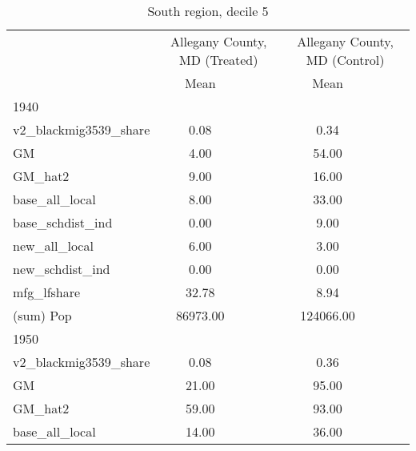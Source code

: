 \begin{table}[htbp]\centering
\def\sym#1{\ifmmode^{#1}\else\(^{#1}\)\fi}
\caption{South region, decile 5 \label{tab1}}
\begin{tabular}{l*{2}{ccc}}
\toprule
                    &\multicolumn{3}{c}{Allegany County, MD (Treated)}&\multicolumn{3}{c}{Allegany County, MD (Control)}\\
                    &        Mean&            &            &        Mean&            &            \\
\midrule
1940                &            &            &            &            &            &            \\
v2\_blackmig3539\_share&        0.08&            &            &        0.34&            &            \\
GM                  &        4.00&            &            &       54.00&            &            \\
GM\_hat2             &        9.00&            &            &       16.00&            &            \\
base\_all\_local      &        8.00&            &            &       33.00&            &            \\
base\_schdist\_ind    &        0.00&            &            &        9.00&            &            \\
new\_all\_local       &        6.00&            &            &        3.00&            &            \\
new\_schdist\_ind     &        0.00&            &            &        0.00&            &            \\
mfg\_lfshare         &       32.78&            &            &        8.94&            &            \\
(sum) Pop           &    86973.00&            &            &   124066.00&            &            \\
\midrule
1950                &            &            &            &            &            &            \\
v2\_blackmig3539\_share&        0.08&            &            &        0.36&            &            \\
GM                  &       21.00&            &            &       95.00&            &            \\
GM\_hat2             &       59.00&            &            &       93.00&            &            \\
base\_all\_local      &       14.00&            &            &       36.00&            &            \\

\end{tabular}
\end{table}
